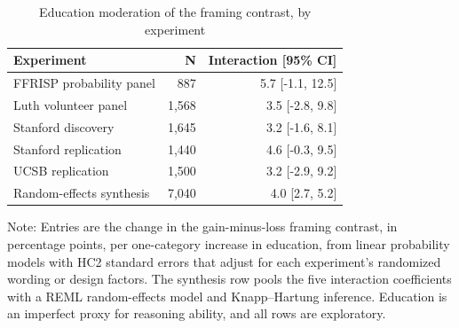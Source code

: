 \begin{table}[H]
\centering
\caption{\label{tab:education-meta}Education moderation of the framing contrast, by experiment}
\centering
\begin{threeparttable}
\begin{tabular}[t]{lrr}
\toprule
Experiment & N & Interaction [95\% CI]\\
\midrule
FFRISP probability panel & 887 & 5.7 [-1.1, 12.5]\\
Luth volunteer panel & 1,568 & 3.5 [-2.8, 9.8]\\
Stanford discovery & 1,645 & 3.2 [-1.6, 8.1]\\
Stanford replication & 1,440 & 4.6 [-0.3, 9.5]\\
UCSB replication & 1,500 & 3.2 [-2.9, 9.2]\\
\midrule
Random-effects synthesis & 7,040 & 4.0 [2.7, 5.2]\\
\bottomrule
\end{tabular}
\begin{tablenotes}[para]
\item Note: Entries are the change in the gain-minus-loss framing contrast, in percentage points, per one-category increase in education, from linear probability models with HC2 standard errors that adjust for each experiment's randomized wording or design factors. The synthesis row pools the five interaction coefficients with a REML random-effects model and Knapp--Hartung inference. Education is an imperfect proxy for reasoning ability, and all rows are exploratory.
\end{tablenotes}
\end{threeparttable}
\end{table}

